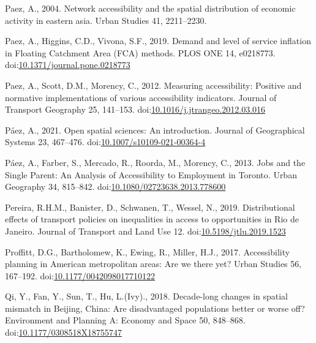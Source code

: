 \documentclass[]{elsarticle} %
\newlength{\cslhangindent}
\newlength{\cslentryspacingunit} %
\newenvironment{CSLReferences}[2] %
 {%
  \setlength{\parindent}{0pt}
  \ifodd #1
  \let\oldpar\par
  \def\par{\hangindent=\cslhangindent\oldpar}
  \fi
  \setlength{\parskip}{#2\cslentryspacingunit}
 }%
 {}
\begin{document}
\begin{CSLReferences}{1}{0}
\leavevmode{}%
Paez, A., 2004. Network accessibility and the spatial distribution of
economic activity in eastern asia. Urban Studies 41, 2211--2230.

\leavevmode{}%
Paez, A., Higgins, C.D., Vivona, S.F., 2019. Demand and level of service
inflation in Floating Catchment Area (FCA) methods. PLOS ONE 14,
e0218773.
doi:\href{https://doi.org/10.1371/journal.pone.0218773}{10.1371/journal.pone.0218773}

\leavevmode{}%
Paez, A., Scott, D.M., Morency, C., 2012. Measuring accessibility:
Positive and normative implementations of various accessibility
indicators. Journal of Transport Geography 25, 141--153.
doi:\href{https://doi.org/10.1016/j.jtrangeo.2012.03.016}{10.1016/j.jtrangeo.2012.03.016}

\leavevmode{}%
Páez, A., 2021. Open spatial sciences: An introduction. Journal of
Geographical Systems 23, 467--476.
doi:\href{https://doi.org/10.1007/s10109-021-00364-4}{10.1007/s10109-021-00364-4}

\leavevmode{}%
Páez, A., Farber, S., Mercado, R., Roorda, M., Morency, C., 2013. Jobs
and the {Single} {Parent}: {An} {Analysis} of {Accessibility} to
{Employment} in {Toronto}. Urban Geography 34, 815--842.
doi:\href{https://doi.org/10.1080/02723638.2013.778600}{10.1080/02723638.2013.778600}

\leavevmode{}%
Pereira, R.H.M., Banister, D., Schwanen, T., Wessel, N., 2019.
Distributional effects of transport policies on inequalities in access
to opportunities in {Rio} de {Janeiro}. Journal of Transport and Land
Use 12.
doi:\href{https://doi.org/10.5198/jtlu.2019.1523}{10.5198/jtlu.2019.1523}

\leavevmode{}%
Proffitt, D.G., Bartholomew, K., Ewing, R., Miller, H.J., 2017.
Accessibility planning in American metropolitan areas: Are we there yet?
Urban Studies 56, 167--192.
doi:\href{https://doi.org/10.1177/0042098017710122}{10.1177/0042098017710122}

\leavevmode{}%
Qi, Y., Fan, Y., Sun, T., Hu, L.(Ivy)., 2018. Decade-long changes in
spatial mismatch in {Beijing}, {China}: {Are} disadvantaged populations
better or worse off? Environment and Planning A: Economy and Space 50,
848--868.
doi:\href{https://doi.org/10.1177/0308518X18755747}{10.1177/0308518X18755747}


\end{CSLReferences}
\end{document}
